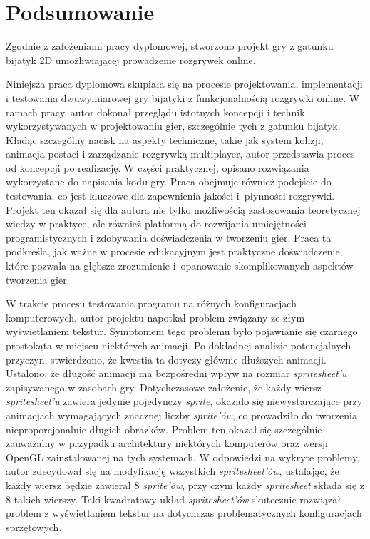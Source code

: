 \chapter{Podsumowanie}
Zgodnie z założeniami pracy dyplomowej, stworzono projekt gry z gatunku bijatyk 2D umożliwiającej prowadzenie rozgrywek online.

Niniejsza praca dyplomowa skupiała się na procesie projektowania, implementacji i testowania dwuwymiarowej gry bijatyki z funkcjonalnością rozgrywki online. W ramach pracy, autor dokonał przeglądu istotnych koncepcji i technik wykorzystywanych w projektowaniu gier, szczególnie tych z gatunku bijatyk. Kładąc szczególny nacisk na aspekty techniczne, takie jak system kolizji, animacja postaci i zarządzanie rozgrywką multiplayer, autor przedstawia proces od koncepcji po realizację. W części praktycznej, opisano rozwiązania wykorzystane do napisania kodu gry. Praca obejmuje również podejście do testowania, co jest kluczowe dla zapewnienia jakości i~płynności rozgrywki. Projekt ten okazał się dla autora nie tylko możliwością zastosowania teoretycznej wiedzy w praktyce, ale również platformą do rozwijania umiejętności programistycznych i zdobywania doświadczenia w tworzeniu gier. Praca ta podkreśla, jak ważne w procesie edukacyjnym jest praktyczne doświadczenie, które pozwala na głębsze zrozumienie i~opanowanie skomplikowanych aspektów tworzenia gier.

W trakcie procesu testowania programu na różnych konfiguracjach komputerowych, autor projektu napotkał problem związany ze złym wyświetlaniem tekstur. Symptomem tego problemu było pojawianie się czarnego prostokąta w miejscu niektórych animacji. Po dokładnej analizie potencjalnych przyczyn, stwierdzono, że kwestia ta dotyczy głównie dłuższych animacji. Ustalono, że długość animacji ma bezpośredni wpływ na rozmiar \emph{spritesheet'u} zapisywanego w zasobach gry. Dotychczasowe założenie, że każdy wiersz \emph{spritesheet'u} zawiera jedynie pojedynczy \emph{sprite}, okazało się niewystarczające przy animacjach wymagających znacznej liczby \emph{sprite'ów}, co prowadziło do tworzenia nieproporcjonalnie długich obrazków. Problem ten okazał się szczególnie zauważalny w przypadku architektury niektórych komputerów oraz wersji OpenGL zainstalowanej na tych systemach. W odpowiedzi na wykryte problemy, autor zdecydował się na modyfikację wszystkich \emph{spritesheet'ów}, ustalając, że każdy wiersz będzie zawierał 8 \emph{sprite'ów}, przy czym każdy \emph{spritesheet} składa się z 8 takich wierszy. Taki kwadratowy układ \emph{spritesheet'ów} skutecznie rozwiązał problem z wyświetlaniem tekstur na dotychczas problematycznych konfiguracjach sprzętowych.

